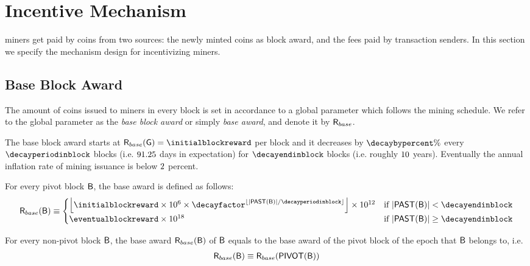 
\section{Incentive Mechanism}
\label{sec:incentive}

\name miners get paid by \name coins from two sources: the newly minted \name coins as block award,
and the fees paid by transaction senders.
In this section we specify the mechanism design for incentivizing \name miners. 




\subsection{Base Block Award}
\label{subsec:baseaward}
The amount of coins issued to miners in every block is set in accordance to a global parameter which follows the mining schedule.
We refer to the global parameter as the \emph{base block award} or simply \emph{base award}, and denote it by $\textsf{R}_{base}$. 



	The base block award starts at $\baseaward(\gblock) = \initialblockreward$ \coinsign per block and it decreases by $\decaybypercent\%$ 
	every $\decayperiodinblock$ blocks
	(i.e. $91.25$ days in expectation)
	for $\decayendinblock$ blocks (i.e. roughly $10$ years).
	Eventually the annual inflation rate of mining issuance is below $2$ percent.
	
	For every pivot block $\textsf{B}$, the base award is defined as follows:
	\begin{align}
		\baseaward(\block)\eqdef
		\begin{cases}
			\left\lfloor\initialblockreward \times 10^6 \times \decayfactor^{\lfloor \left|\past(\block)\right|/\decayperiodinblock \rfloor}\right\rfloor\times 10^{12} & \mbox{if $ \left|\past(\block)\right| < \decayendinblock$} \\
			\eventualblockreward \times 10^{18} & \mbox{if $ \left|\past(\block)\right| \ge \decayendinblock$}
		\end{cases}
	\end{align}

	For every non-pivot block $\textsf{B}$,
	the base award $\textsf{R}_{base}(\textsf{B})$ of $\textsf{B}$ 
	equals to the base award of the pivot block of the epoch that $\textsf{B}$ belongs to,
	i.e. 
	\begin{align*}
		\textsf{R}_{base}(\textsf{B})\equiv \textsf{R}_{base}(\mathsf{PIVOT}{\left({\textsf{B}} \right)})
	\end{align*}

